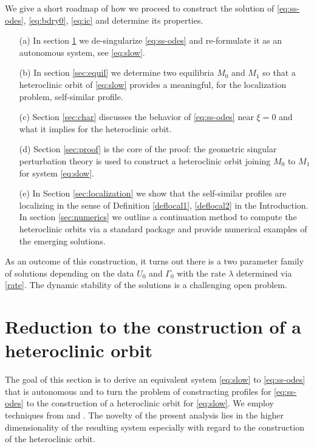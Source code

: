 \documentclass[11pt]{article}
\theoremstyle{remark}
\begin{document}
\medskip

We give a short roadmap of how we proceed to construct the solution of \eqref{eq:ss-odes}, \eqref{eq:bdry0}, \eqref{eq:ic} and
determine its properties.
\begin{itemize}
\item[(a)]
In section \ref{sec:formulation} we de-singularize \eqref{eq:ss-odes} and re-formulate it as an autonomous system,
see \eqref{eq:slow}.
\item[(b)]
In section \ref{sec:equil} we determine two equilibria $M_0$ and $M_1$  so that a heteroclinic orbit of \eqref{eq:slow} provides a meaningful, for the localization problem, self-similar profile.
\item[(c)]
Section \ref{sec:char} discusses the behavior of \eqref{eq:ss-odes} near $\xi = 0$ and what it implies for the heteroclinic orbit.
\item[(d)]
Section \ref{sec:proof}  is the core of the proof: the geometric singular perturbation theory is used to construct a heteroclinic
orbit joining $M_0$ to $M_1$ for system \eqref{eq:slow}.
\item[(e)] In Section \ref{sec:localization} we show that the self-similar profiles are localizing in the sense of Definition
\eqref{deflocal1}, \eqref{deflocal2} in the Introduction.
In section \ref{sec:numerics} we outline  a continuation method to compute the heteroclinic orbits via a standard package and provide
numerical examples of the emerging solutions.
\end{itemize}
As an outcome of this construction, it turns out  there is a two parameter family of solutions depending on the data $U_0$ and $\Gamma_0$ with the rate $\lambda$ determined via \eqref{rate}.
The dynamic stability of the solutions is a challenging open problem.



\section{Reduction to the construction of a heteroclinic orbit} \label{sec:formulation}
The goal of this section is to derive an equivalent system \eqref{eq:slow} to \eqref{eq:ss-odes} that is autonomous and to turn the problem of
constructing profiles for \eqref{eq:ss-odes} to the construction of a heteroclinic orbit for \eqref{eq:slow}. We employ techniques from \cite{KOT14} and \cite{LT16}.
The novelty of the present analysis lies in the higher dimensionality of the resulting system especially  with regard to the construction of the heteroclinic orbit.
\end{document}
